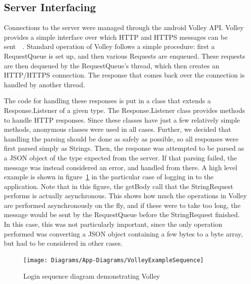 \documentclass[12pt]{report}
\let\Oldsubsection\subsection
\renewcommand{\subsection}{\FloatBarrier\Oldsubsection}
\begin{document}

\subsection{Server Interfacing} \label{server-interfacing}

Connections to the server were managed through the android Volley API. Volley provides a simple interface over which
HTTP and HTTPS messages can be sent~\autocite{ANDROIDVOLLEY}~\autocite{VOLLEY}.
Standard operation of Volley follows a simple procedure: first a RequestQueue is
set up, and then various Requests are enqueued. These requests are then dequeued by the RequestQueue's thread, which
then creates an HTTP/HTTPS connection. The response that comes back over the connection is handled by another thread.

The code for handling these responses is put in a class that extends a Response.Listener of a given type. The
Response.Listener class provides methods to handle HTTP responses. Since these classes have just a few relatively simple
methods, anonymous classes were used in all cases. Further, we decided that handling the parsing should be done as
safely as possible, so all responses were first parsed simply as Strings. Then, the response was attempted to be parsed
as a JSON object of the type expected from the server. If that parsing failed, the message was instead considered an
error, and handled from there. A high level example is shown in figure~\ref{fig:login-volley} in the particular case of
logging in to the application. Note that in this figure, the getBody call that the StringRequest performs is actually
asynchronous. This shows how much the operations in Volley are performed asynchronously on the fly, and if these were
to take too long, the message would be sent by the RequestQueue before the StringRequest finished. In this case, this
was not particularly important, since the only operation performed was converting a JSON object containing a few bytes
to a byte array, but had to be considered in other cases.

\begin{figure}
    \texttt{[image: Diagrams/App-Diagrams/VolleyExampleSequence]}
    \caption{Login sequence diagram demonstrating Volley}
    \label{fig:login-volley}
\end{figure}

\end{document}
